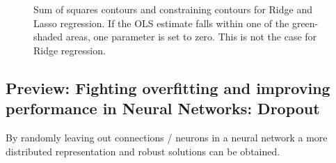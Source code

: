\begin{figure}[!htb]
    \centering
    
    \caption{Sum of squares contours and constraining contours for Ridge and Lasso regression. If the OLS estimate falls within one of
    the green-shaded areas, one parameter is set to zero. This is not the case for Ridge regression.}
    \label{fig:ridge_lasso_constraint}
\end{figure}

\subsection{Preview: Fighting overfitting and improving performance in Neural Networks: Dropout}
By randomly leaving out connections / neurons in a neural network a more distributed representation
and robust solutions can be obtained.

\pagebreak